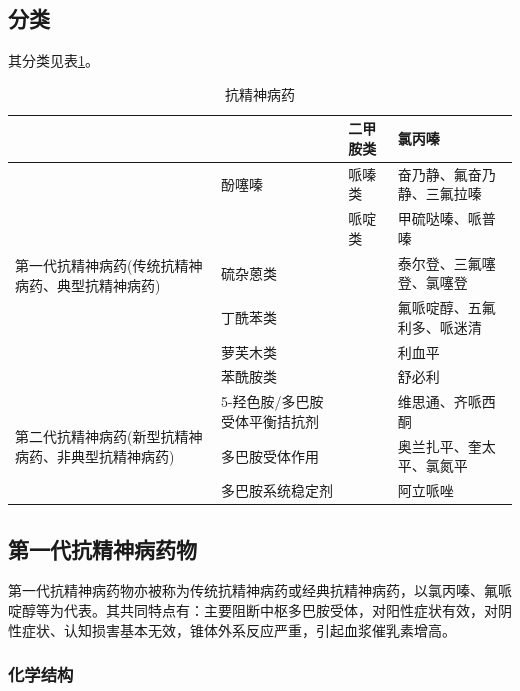 \subsection{分类}

其分类见表\ref{tab18-1}。

\begin{table}[ht]
    \caption{抗精神病药}
    \label{tab18-1}
    \centering
    \begin{tabular}{llll}
    \toprule
    & & 二甲胺类&氯丙嗪\\
    \midrule
    \multirow[t]{6}{3cm}{第一代抗精神病药(传统抗精神病药、典型抗精神病药) }&  酚噻嗪&哌嗪类&奋乃静、氟奋乃静、三氟拉嗪
\\
~&&哌啶类&甲硫哒嗪、哌普嗪
\\
~&硫杂蒽类 && 泰尔登、三氟噻登、氯噻登\\
~&丁酰苯类&&氟哌啶醇、五氟利多、哌迷清\\
~&萝芙木类&&利血平\\
~&苯酰胺类&&舒必利\\
\multirow[t]{3}{3cm}{第二代抗精神病药(新型抗精神病药、非典型抗精神病药)}&5-羟色胺/多巴胺受体平衡拮抗剂&&
维思通、齐哌西酮\\
~&多巴胺受体作用&&
奥兰扎平、奎太平、氯氮平\\
~&多巴胺系统稳定剂&&
阿立哌唑\\
    \bottomrule
    \end{tabular}
\end{table}

\subsection{第一代抗精神病药物}

第一代抗精神病药物亦被称为传统抗精神病药或经典抗精神病药，以氯丙嗪、氟哌啶醇等为代表。其共同特点有：主要阻断中枢多巴胺受体，对阳性症状有效，对阴性症状、认知损害基本无效，锥体外系反应严重，引起血浆催乳素增高。

\subsubsection{化学结构}


